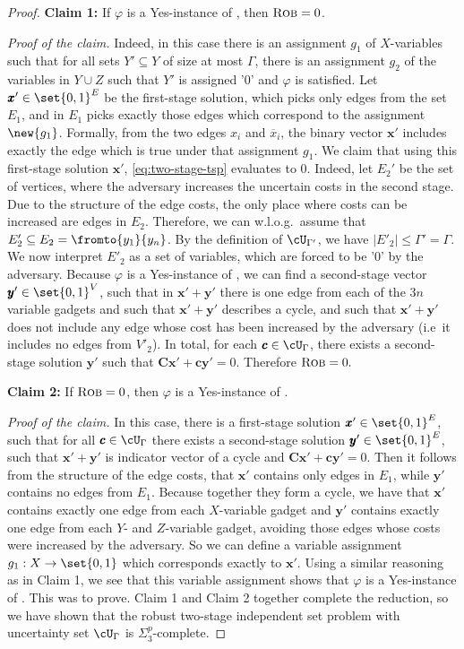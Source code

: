 \documentclass[a4paper,abstracton]{scrartcl}
\begin{document}
\begin{proof}
\textbf{Claim 1:} If $\varphi$ is a Yes-instance of {\radj}, then $\textsc{Rob} = 0$. 

\emph{Proof of the claim.} Indeed, in this case there is an assignment $g_1$ of $X$-variables such that for all sets $Y' \subseteq Y$ of size at most $\Gamma$, there is an assignment $g_2$ of the variables in $Y \cup Z$ such that $Y'$ is assigned '$0$' and $\varphi$ is satisfied. 
Let $\pmb x' \in \set{0,1}^E$ be the first-stage solution, which picks only edges from the set $E_1$, and in $E_1$ picks exactly those edges which correspond to the assignment $\new{g_1}$. Formally, from the two edges $x_i$ and $\overline{x}_i$, the binary vector $\pmb x'$ includes exactly the edge which is true under that assignment $g_1$. 
We claim that using this first-stage solution $\pmb x'$, \cref{eq:two-stage-tsp} evaluates to $0$. 
Indeed, let $E_2'$ be the set of vertices, where the adversary increases the uncertain costs in the second stage. 
Due to the structure of the  edge costs, the only place where costs can be increased are edges in $E_2$. Therefore, we can w.l.o.g.\ assume that $E_2' \subseteq E_2 = \fromto{y_1}{y_n}$. 
By the definition of $\cU_{\Gamma'}$, we have $|E'_2| \leq \Gamma' = \Gamma$. 
We now interpret $E'_2$ as a set of variables, which are forced to be '0' by the adversary.
Because $\varphi$ is a Yes-instance of {\radj}, we can find a second-stage vector $\pmb y' \in \set{0,1}^V$, such that in $\pmb x' + \pmb y'$ there is one edge from each of the $3n$ variable gadgets and such that $\pmb x' + \pmb y'$ describes a  cycle, and such that $\pmb x' + \pmb y'$ does not include any edge whose cost has been increased by the adversary (i.e\ it includes no edges from $V'_2$).
In total, for each $\pmb c \in \cU_\Gamma$, there exists a second-stage solution $\pmb y'$ such that $\pmb C \pmb x' + \pmb c \pmb y' = 0$. 
Therefore $\textsc{Rob} = 0.$

\textbf{Claim 2:} If $\textsc{Rob} = 0$, then $\varphi$ is a Yes-instance of {\radj}. 

\emph{Proof of the claim.} 
In this case, there is a first-stage solution $\pmb x' \in \set{0,1}^E$, such that for all $\pmb c \in \cU_\Gamma$ there exists a second-stage solution $\pmb y' \in \set{0,1}^E$, 
such that $\pmb x'  + \pmb y'$ is indicator vector of a  cycle and $\pmb C\pmb x' + \pmb c\pmb y' = 0$.
Then it follows from the structure of the edge costs, that $\pmb x'$ contains only edges in $E_1$, while $\pmb y'$ contains no edges from $E_1$. Because together they form a  cycle, we have that $\pmb x'$ contains exactly one edge from each $X$-variable gadget and $\pmb y'$ contains exactly one edge from each $Y$- and $Z$-variable gadget, avoiding those edges whose costs were increased by the adversary.
So we can define a variable assignment $g_1 : X \rightarrow \set{0,1}$ which corresponds exactly to $\pmb x'$. 
Using a similar reasoning as in Claim 1, we see that this variable assignment shows that $\varphi$ is a Yes-instance of {\radj}. 
This was to prove. Claim 1 and Claim 2 together complete the reduction, so we have shown that the robust two-stage independent set problem with uncertainty set $\cU_\Gamma$ is $\Sigma_3^p$-complete.
\end{proof}
\end{document}
